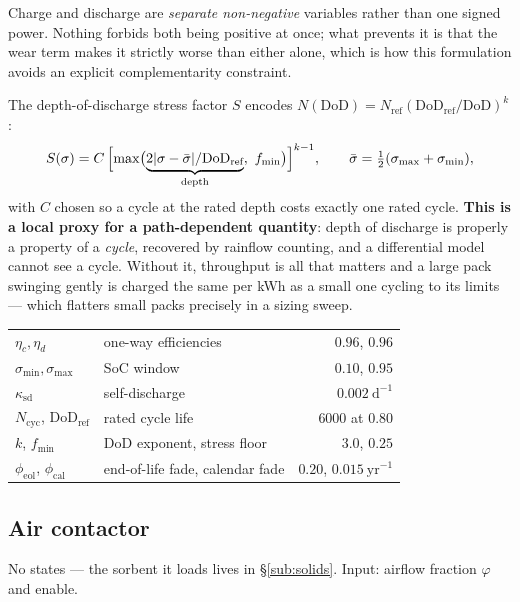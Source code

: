 \documentclass[11pt,a4paper]{article}
\begin{document}
Charge and discharge are \emph{separate non-negative} variables rather than one
signed power. Nothing forbids both being positive at once; what prevents it is
that the wear term makes it strictly worse than either alone, which is how this
formulation avoids an explicit complementarity constraint.

The depth-of-discharge stress factor $S$ encodes
$N(\mathrm{DoD}) = N_{\text{ref}}(\mathrm{DoD}_{\text{ref}}/\mathrm{DoD})^{k}$:
\begin{equation}
S(\sigma) = C\,\Bigl[\max\bigl(\underbrace{2|\sigma-\bar\sigma|/\mathrm{DoD}_{\text{ref}}}_{\text{depth}},\ f_{\min}\bigr)\Bigr]^{k-1},
\qquad \bar\sigma=\tfrac12(\sigma_{\max}+\sigma_{\min}),
\end{equation}
with $C$ chosen so a cycle at the rated depth costs exactly one rated cycle.
\textbf{This is a local proxy for a path-dependent quantity}: depth of discharge
is properly a property of a \emph{cycle}, recovered by rainflow counting, and a
differential model cannot see a cycle. Without it, throughput is all that
matters and a large pack swinging gently is charged the same per kWh as a small
one cycling to its limits --- which flatters small packs precisely in a sizing
sweep.

\begin{center}\small
\begin{tabular}{llr}
\toprule
$\eta_c,\eta_d$ & one-way efficiencies & $0.96$, $0.96$\\
$\sigma_{\min},\sigma_{\max}$ & SoC window & $0.10$, $0.95$\\
$\kappa_{\text{sd}}$ & self-discharge & $0.002\ \mathrm{d^{-1}}$\\
$N_{\text{cyc}}$, $\mathrm{DoD}_{\text{ref}}$ & rated cycle life & $6000$ at $0.80$\\
$k$, $f_{\min}$ & DoD exponent, stress floor & $3.0$, $0.25$\\
$\phi_{\text{eol}}$, $\phi_{\text{cal}}$ & end-of-life fade, calendar fade & $0.20$, $0.015\ \mathrm{yr^{-1}}$\\
\bottomrule
\end{tabular}
\end{center}

\subsection{Air contactor}

No states --- the sorbent it loads lives in \S\ref{sub:solids}. Input: airflow
fraction $\varphi$ and enable.
\end{document}
